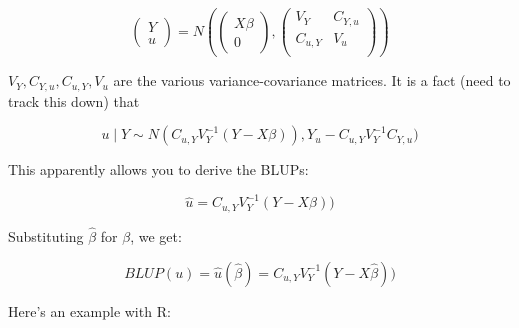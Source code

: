 \documentclass[12pt]{amsart}
\begin{document}
\begin{equation}
\begin{pmatrix}
Y \\
u
\end{pmatrix}
= 
N\left(
\begin{pmatrix}
X\beta\\
0
\end{pmatrix},
\begin{pmatrix}
V_Y & C_{Y,u}\\
C_{u,Y} & V_u \\
\end{pmatrix}
\right)
\end{equation}

$V_Y, C_{Y,u}, C_{u,Y}, V_u$ are the various variance-covariance matrices. 
It is a fact (need to track this down) that

\begin{equation}
u\mid Y \sim N(C_{u,Y}V_Y^{-1}(Y-X\beta)), 
Y_u - C_{u,Y} V_Y^{-1} C_{Y,u})
\end{equation}

This apparently allows you to derive the BLUPs:

\begin{equation}
\hat{u}= C_{u,Y}V_Y^{-1}(Y-X\beta))
\end{equation}

Substituting $\hat{\beta}$ for $\beta$, we get:

\begin{equation}
BLUP(u)= \hat{u}(\hat{\beta})=C_{u,Y}V_Y^{-1}(Y-X\hat{\beta}))
\end{equation}

Here's an example with R:
\end{document}
